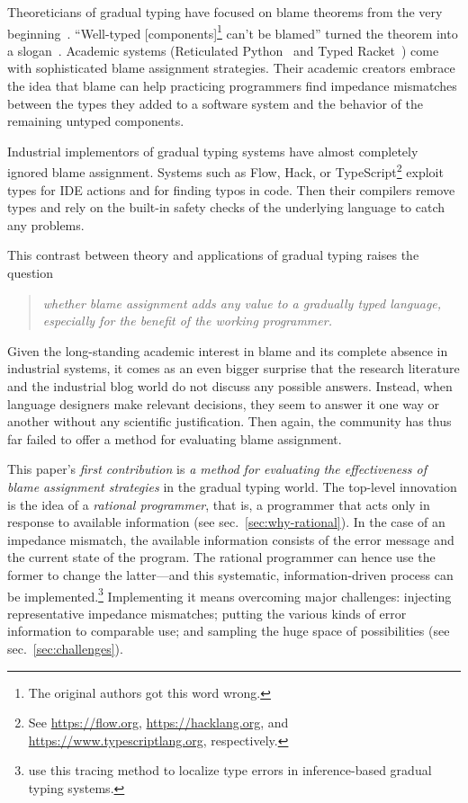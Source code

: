 
Theoreticians of gradual typing have focused on blame theorems from the very
beginning~\cite{mf-toplas-2009, tf-dls-2006}. ``Well-typed
[components]\footnote{The original authors got this word wrong.} can't be
blamed'' turned the theorem into a slogan~\cite{wf-esop-2009}. Academic systems
(Reticulated Python~\cite{vsc-dls-2019, vss-popl-2017, vksb-dls-2014} and Typed
Racket~\cite{tf-dls-2006,tf-popl-2008,tfffgksst-snapl-2017,tf-icfp-2010}) come
with sophisticated blame assignment strategies. Their academic creators embrace
the idea that blame can help practicing programmers find impedance mismatches
between the types they added to a software system and the behavior of the
remaining untyped components.

Industrial implementors of gradual typing systems have almost
completely ignored blame assignment.  Systems such as Flow, Hack, or
TypeScript\footnote{See \url{https://flow.org},
\url{https://hacklang.org}, and \url{https://www.typescriptlang.org},
respectively.} exploit types for IDE actions and for finding typos in
code. Then their compilers remove types and rely on the built-in
safety checks of the underlying language to catch any problems.

This contrast between theory and applications of gradual typing raises the question 
\begin{quote}
 \it
 whether blame assignment adds any value to a gradually typed language,
 especially for the benefit of the working programmer.
\end{quote}
Given the long-standing academic interest in blame and its complete absence in
industrial systems, it comes as an even bigger surprise that the research
literature and the industrial blog world do not discuss any possible answers.
Instead, when language designers make relevant decisions, they seem to answer it
one way or another without any scientific justification. Then again, the
community has thus far failed to offer a method for evaluating blame assignment.

This paper's {\em first contribution\/} is {\em a method for evaluating the
effectiveness of blame assignment strategies\/} in the gradual typing world.
The top-level innovation is the idea of a {\em rational programmer\/}, that is,
a programmer that acts only in response to available information (see
sec.~\ref{sec:why-rational}). In the case of an impedance mismatch, the
available information consists of the error message and the current state of the
program. The rational programmer can hence use the former to change the
latter---and this systematic, information-driven process can be
implemented.\footnote{\citet{cc-snapl-19} use this tracing method to localize
type errors in inference-based gradual typing systems.}  Implementing it means
overcoming major challenges: injecting representative impedance mismatches;
putting the various kinds of error information to comparable use; and sampling
the huge space of possibilities (see sec.~\ref{sec:challenges}).

